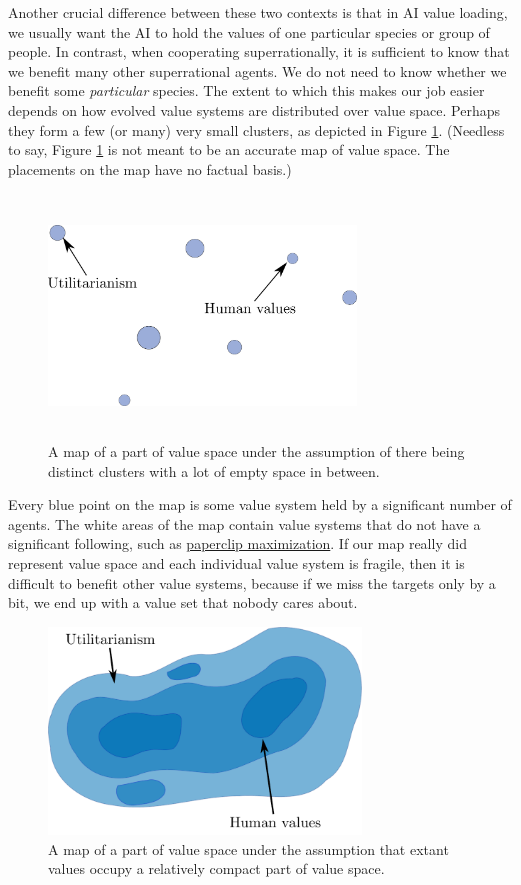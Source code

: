 Another crucial difference between these two contexts is that in AI
value loading, we usually want the AI to hold the values of one
particular species or group of people. In contrast, when cooperating
superrationally, it is sufficient to know that we benefit many other
superrational agents. We do not need to know whether we benefit some
\emph{particular} species. The extent to which this makes our job easier
depends on how evolved value systems are distributed over value space.
Perhaps they form a few (or many) very small clusters, as depicted in
Figure \ref{map-of-value-space-with-clusters}.
(Needless to say, Figure
\ref{map-of-value-space-with-clusters} is not meant to
be an accurate map of value space. The placements on the map have no
factual basis.)

\begin{figure}
    \centering
    \includegraphics[width=3.21875in,height=2.54167in]{figs/map-of-value-space-with-clusters}
    \caption{A map of a part of value
space under the assumption of there being distinct clusters with a lot
of empty space in between.}
    \label{map-of-value-space-with-clusters}
\end{figure}

Every blue point on the map is some value system held by a significant
number of agents. The white areas of the map contain value systems that
do not have a significant following, such as
\href{https://wiki.lesswrong.com/wiki/Paperclip_maximizer}{paperclip
maximization}. If our map really did represent value space and each
individual value system is fragile, then it is difficult to benefit
other value systems, because if we miss the targets only by a bit, we
end up with a value set that nobody cares about.

\begin{figure}
    \centering
    \includegraphics[width=3.26772in]{figs/map-of-value-space-compact}
    \caption{A map of a part of value space under the assumption that extant values occupy a
    relatively compact part of value space.}
    \label{map-of-value-space-compact}
\end{figure}


